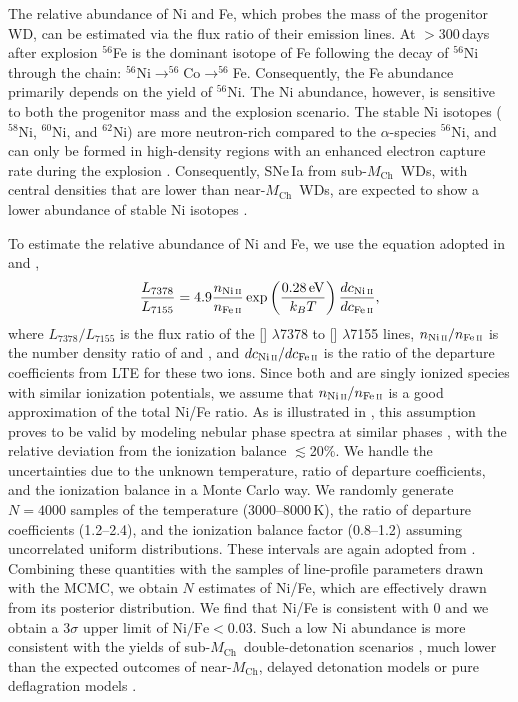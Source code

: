 \documentclass[twocolumn]{aastex631}
\newcommand{\Mch}{$M_\mathrm{Ch}$}
\begin{document}
\begin{CJK*}{UTF8}{gbsn}
The relative abundance of Ni and Fe, which probes the mass of the progenitor WD, can be estimated via the flux ratio of their emission lines. At $>$300\,days after explosion $^{56}$Fe is the dominant isotope of Fe following the decay of $^{56}$Ni through the chain: $^{56}$Ni$\rightarrow^{56}$Co$\rightarrow^{56}$Fe. Consequently, the Fe abundance primarily depends on the yield of $^{56}$Ni. The Ni abundance, however, is sensitive to both the progenitor mass and the explosion scenario. The stable Ni isotopes ($^{58}$Ni, $^{60}$Ni, and $^{62}$Ni) are more neutron-rich compared to the $\alpha$-species $^{56}$Ni, and can only be formed in high-density regions with an enhanced electron capture rate during the explosion \citep{Nomoto_1984,Khokhlov_1991}. Consequently, SNe\,Ia from sub-\Mch\ WDs, with central densities that are lower than near-\Mch\ WDs, are expected to show a lower abundance of stable Ni isotopes \citep{Iwamoto_1999,Seitenzahl_2013,Shen_DD_2018}. 

To estimate the relative abundance of Ni and Fe, we use the equation adopted in \citet{Jerkstrand_2015} and \citet{Maguire_2018},
\begin{equation}
    \frac{L_{7378}}{L_{7155}} = 4.9\frac{n_{\mathrm{Ni}\,\textsc{ii}}}{n_{\mathrm{Fe}\,\textsc{ii}}}\exp\left(\frac{0.28\,\mathrm
    {eV}}{k_BT}\right)\frac{dc_{\mathrm{Ni}\,\textsc{ii}}}{dc_{\mathrm{Fe}\,\textsc{ii}}},
\end{equation}
where $L_{7378}/L_{7155}$ is the flux ratio of the [] $\lambda$7378 to [] $\lambda$7155 lines, $n_{\mathrm{Ni}\,\textsc{ii}}/n_{\mathrm{Fe}\,\textsc{ii}}$ is the number density ratio of  and , and ${dc_{\mathrm{Ni}\,\textsc{ii}}}/{dc_{\mathrm{Fe}\,\textsc{ii}}}$ is the ratio of the departure coefficients from LTE for these two ions. Since both  and  are singly ionized species with similar ionization potentials, we assume that $n_{\mathrm{Ni}\,\textsc{ii}}/n_{\mathrm{Fe}\,\textsc{ii}}$ is a good approximation of the total Ni/Fe ratio. As is illustrated in \citet{Maguire_2018}, this assumption proves to be valid by modeling nebular phase spectra at similar phases \citep{Fransson_2015,Shingles_2022}, with the relative deviation from the ionization balance $\lesssim$20\%. We handle the uncertainties due to the unknown temperature, ratio of departure coefficients, and the ionization balance in a Monte Carlo way. We randomly generate $N=4000$ samples of the temperature (3000--8000\,K), the ratio of departure coefficients (1.2--2.4), and the ionization balance factor (0.8--1.2) assuming uncorrelated uniform distributions. These intervals are again adopted from \citet{Maguire_2018}. Combining these quantities with the samples of line-profile parameters drawn with the MCMC, we obtain $N$ estimates of Ni/Fe, which are effectively drawn from its posterior distribution. We find that Ni/Fe is consistent with 0 and we obtain a 3$\sigma$ upper limit of $\mathrm{Ni/Fe}<0.03$. Such a low Ni abundance is more consistent with the yields of sub-\Mch\ double-detonation scenarios \citep{Shen_DD_2018}, much lower than the expected outcomes of near-\Mch, delayed detonation models \citep{Seitenzahl_2013} or pure deflagration models \citep{Iwamoto_1999}.


\end{CJK*}
\end{document}
